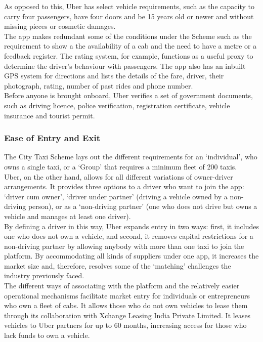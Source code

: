 \documentclass[a4paper, 12pt, twoside]{article}
\begin{document}
As opposed to this, Uber has select vehicle requirements, such as the capacity to carry four passengers, have four doors and be 15 years old or newer and without missing pieces or cosmetic damages.\\

The app makes redundant some of the conditions under the Scheme such as the requirement to show a the availability of a cab and the need to have a metre or a feedback register. The rating system, for example, functions as a useful proxy to determine the driver’s behaviour with passengers. The app also has an inbuilt GPS system for directions and lists the details of the fare, driver, their photograph, rating, number of past rides and phone number.\\

Before anyone is brought onboard, Uber verifies a set of government documents, such as driving licence, police verification, registration certificate, vehicle insurance and tourist permit.

\subsubsection{Ease of Entry and Exit}
The City Taxi Scheme lays out the different requirements for an ‘individual’, who owns a single taxi, or a ‘Group’ that requires a minimum fleet of 200 taxis. \\

Uber, on the other hand, allows for all different variations of owner-driver arrangements. It provides three options to a driver who want to join the app: ‘driver cum owner’, ‘driver under partner’ (driving a vehicle owned by a non-driving person), or as a ‘non-driving partner’ (one who does not drive but owns a vehicle and manages at least one driver).\\

By defining a driver in this way, Uber expands entry in two ways: first, it includes one who does not own a vehicle, and second, it removes capital restrictions for a non-driving partner by allowing anybody with more than one taxi to join the platform. By accommodating all kinds of suppliers under one app, it increases the market size and, therefore, resolves some of the ‘matching’ challenges the industry previously faced. \\

The different ways of associating with the platform and the relatively easier operational mechanisms facilitate market entry for individuals or entrepreneurs who own a fleet of cabs. It allows those who do not own vehicles to lease them through its collaboration with Xchange Leasing India Private Limited. It leases vehicles to Uber partners for up to 60 months, increasing access for those who lack funds to own a vehicle. \\
\end{document}
